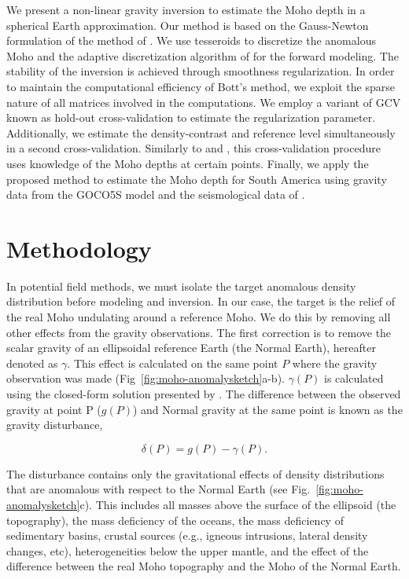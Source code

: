 We present a non-linear gravity inversion to estimate the Moho depth in
a spherical Earth approximation.
Our method is based on the \citet{silva2014} Gauss-Newton formulation of the
method of \citet{bott1960}.
We use tesseroids to discretize the anomalous Moho and the adaptive
discretization algorithm of \citet{uieda2016} for the forward modeling.
The stability of the inversion is achieved through smoothness regularization.
In order to maintain the computational efficiency of Bott's method,
we exploit the sparse nature of all matrices involved in the computations.
We employ a variant of GCV known as hold-out cross-validation \citep{kim2009}
to estimate the regularization parameter.
Additionally, we estimate the density-contrast and reference level
simultaneously in a second cross-validation.
Similarly to \citet{silva2006} and \citet{martins2010}, this cross-validation
procedure uses knowledge of the Moho depths at certain points.
Finally, we apply the proposed method to estimate the Moho depth for South
America using gravity data from the GOCO5S model \citep{mayer-guerr2015} and
the seismological data of \citet{assumpcao2013a}.



\section{Methodology}

In potential field methods, we must isolate the target anomalous density
distribution before modeling and inversion.
In our case, the target is the relief of the real Moho undulating around a
reference Moho.
We do this by removing all other effects from the gravity observations.
The first correction is to remove the
scalar gravity of an ellipsoidal reference Earth (the Normal Earth),
hereafter denoted as $\gamma$.
This effect is calculated on the same point $P$ where
the gravity observation was made
(Fig~\ref{fig:moho-anomalysketch}a-b).
$\gamma(P)$ is calculated using
the closed-form solution presented by \citet{li2001a}.
The difference between the observed gravity at point P ($g(P)$)
and Normal gravity at the same point
is known as the gravity disturbance,

\begin{equation}
    \delta(P) = g(P) - \gamma(P).
    \label{eq:moho-disturbance}
\end{equation}

The disturbance contains only the gravitational effects of density
distributions that are anomalous with respect to the Normal Earth
(see Fig.~\ref{fig:moho-anomalysketch}c).
This includes all masses above the surface of the ellipsoid (the topography),
the mass deficiency of the oceans,
the mass deficiency of sedimentary basins,
crustal sources (e.g., igneous intrusions, lateral density changes, etc),
heterogeneities below the upper mantle,
and the effect of the difference between the real Moho
topography and the Moho of the Normal Earth.

